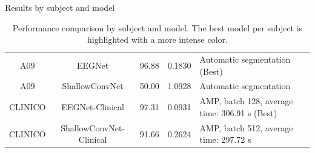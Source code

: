 \documentclass{beamer}
\begin{document}
\begin{frame}{Results by subject and model}
\begin{table}[htbp]
{\begin{tabular}{|c|c|c|c|p{5cm}|}
A09 & \cellcolor{blue!30}EEGNet & 96.88 & 0.1830 & Automatic segmentation (Best) \\
A09 & \cellcolor{green!15}ShallowConvNet & 50.00 & 1.0928 & Automatic segmentation \\
CLINICO & \cellcolor{blue!30}EEGNet-Clinical & 97.31 & 0.0931 & AMP, batch 128, average time: 306.91 s (Best) \\
CLINICO & \cellcolor{green!15}ShallowConvNet-Clinical & 91.66 & 0.2624 & AMP, batch 512, average time: 297.72 s \\
\hline
\end{tabular}
}
\caption{\tiny Performance comparison by subject and model. The best model per subject is highlighted with a more intense color.}
\end{table}
\end{frame}
\end{document}
